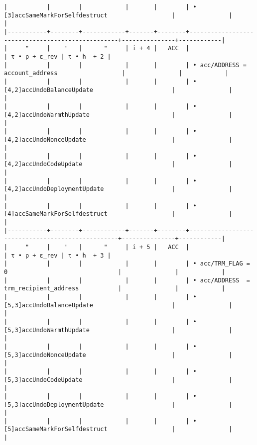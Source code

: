 \documentclass[varwidth=\maxdimen,margin=0.5cm,multi={verbatim}]{standalone}
\begin{document}
\begin{verbatim}
|           |        |            |       |        | • [3]accSameMarkForSelfdestruct                  |               |            |
|-----------+--------+------------+-------+--------+--------------------------------------------------+---------------+------------|
|     "     |    "   |      "     | i + 4 |   ACC  |                                                  | τ • ρ + ε_rev | τ • h  + 2 |
|           |        |            |       |        | • acc/ADDRESS = account_address                  |               |            |
|           |        |            |       |        | • [4,2]accUndoBalanceUpdate                      |               |            |
|           |        |            |       |        | • [4,2]accUndoWarmthUpdate                       |               |            |
|           |        |            |       |        | • [4,2]accUndoNonceUpdate                        |               |            |
|           |        |            |       |        | • [4,2]accUndoCodeUpdate                         |               |            |
|           |        |            |       |        | • [4,2]accUndoDeploymentUpdate                   |               |            |
|           |        |            |       |        | • [4]accSameMarkForSelfdestruct                  |               |            |
|-----------+--------+------------+-------+--------+--------------------------------------------------+---------------+------------|
|     "     |    "   |      "     | i + 5 |   ACC  |                                                  | τ • ρ + ε_rev | τ • h  + 3 |
|           |        |            |       |        | • acc/TRM_FLAG = 0                               |               |            |
|           |        |            |       |        | • acc/ADDRESS  = trm_recipient_address           |               |            |
|           |        |            |       |        | • [5,3]accUndoBalanceUpdate                      |               |            |
|           |        |            |       |        | • [5,3]accUndoWarmthUpdate                       |               |            |
|           |        |            |       |        | • [5,3]accUndoNonceUpdate                        |               |            |
|           |        |            |       |        | • [5,3]accUndoCodeUpdate                         |               |            |
|           |        |            |       |        | • [5,3]accUndoDeploymentUpdate                   |               |            |
|           |        |            |       |        | • [5]accSameMarkForSelfdestruct                  |               |            |

\end{verbatim}
\end{document}
